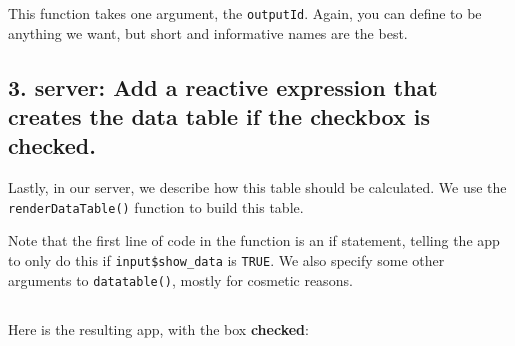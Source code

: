 \documentclass[
  letterpaper,
  DIV=11,
  numbers=noendperiod]{scrreprt}
\newenvironment{Shaded}{\begin{snugshade}}{\end{snugshade}}
\newcommand{\AttributeTok}[1]{\textcolor[rgb]{0.40,0.46,0.14}{#1}}
\newcommand{\CommentTok}[1]{\textcolor[rgb]{0.37,0.37,0.37}{#1}}
\newcommand{\ConstantTok}[1]{\textcolor[rgb]{0.56,0.35,0.01}{#1}}
\newcommand{\ControlFlowTok}[1]{\textcolor[rgb]{0.00,0.46,0.62}{#1}}
\newcommand{\DecValTok}[1]{\textcolor[rgb]{0.68,0.00,0.00}{#1}}
\newcommand{\FunctionTok}[1]{\textcolor[rgb]{0.28,0.35,0.67}{#1}}
\newcommand{\NormalTok}[1]{\textcolor[rgb]{0.00,0.46,0.62}{#1}}
\newcommand{\OtherTok}[1]{\textcolor[rgb]{0.00,0.46,0.62}{#1}}
\newcommand{\SpecialCharTok}[1]{\textcolor[rgb]{0.37,0.37,0.37}{#1}}
\begin{document}
This function takes one argument, the \texttt{outputId}. Again, you can
define to be anything we want, but short and informative names are the
best.

\hypertarget{server-add-a-reactive-expression-that-creates-the-data-table-if-the-checkbox-is-checked.}{%
\subsection{\texorpdfstring{3. \textbf{server}: Add a reactive
expression that creates the data table if the checkbox is
checked.}{3. server: Add a reactive expression that creates the data table if the checkbox is checked.}}\label{server-add-a-reactive-expression-that-creates-the-data-table-if-the-checkbox-is-checked.}}

\begin{Shaded}
\end{Shaded}

Lastly, in our server, we describe how this table should be calculated.
We use the \texttt{renderDataTable()} function to build this table.

Note that the first line of code in the function is an if statement,
telling the app to only do this if \texttt{input\$show\_data} is
\texttt{TRUE}. We also specify some other arguments to
\texttt{datatable()}, mostly for cosmetic reasons.

\hypertarget{section-18}{%
\subsection{}\label{section-18}}

Here is the resulting app, with the box \textbf{checked}:
\end{document}

